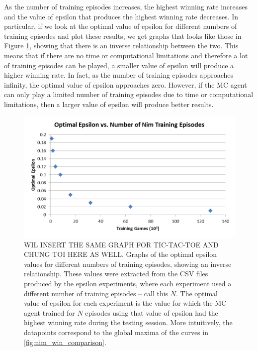 \documentclass[11pt,a4paper]{report}
\begin{document}
As the number of training episodes increases, the highest winning rate increases and the value of epsilon that produces the highest winning rate decreases. In particular, if we look at the optimal value of epsilon for different numbers of training episodes and plot these results, we get graphs that looks like those in Figure \ref{nim-training-vs-opt-epsilon}, showing that there is an inverse relationship between the two. This means that if there are no time or computational limitations and therefore a lot of training episodes can be played, a smaller value of epsilon will produce a higher winning rate. In fact, as the number of training episodes approaches infinity, the optimal value of epsilon approaches zero. However, if the MC agent can only play a limited number of training episodes due to time or computational limitations, then a larger value of epsilon will produce better results.

\begin{figure}[htbp]
	\begin{center}
		\includegraphics[width=\linewidth]{Nim_OptimalEpsilon_vs_Training.png}
		\caption{WIL INSERT THE SAME GRAPH FOR TIC-TAC-TOE AND CHUNG TOI HERE AS WELL. Graphs of the optimal epsilon values for different numbers of training episodes, showing an inverse relationship. These values were extracted from the CSV files produced by the epsilon experiments, where each experiment used a different number of training episodes -- call this $N$. The optimal value of epsilon for each experiment is the value for which the MC agent trained for $N$ episodes using that value of epsilon had the highest winning rate during the testing session. More intuitively, the datapoints correspond to the global maxima of the curves in \ref{fig:nim_win_comparison}. }
		\label{nim-training-vs-opt-epsilon}
	\end{center}
\end{figure}
\end{document}
